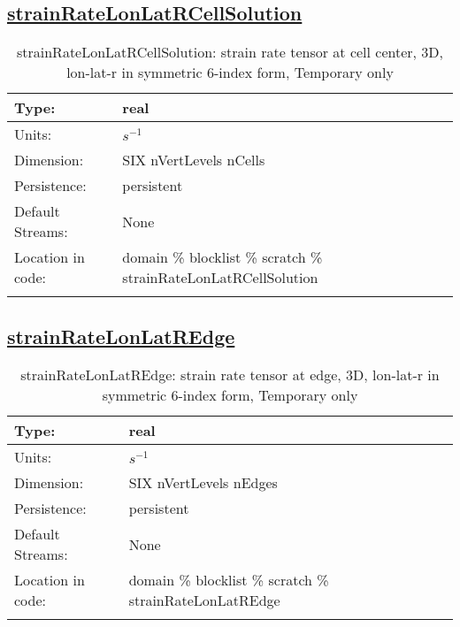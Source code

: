 \subsection[strainRateLonLatRCellSolution]{\hyperref[sec:var_tab_scratch]{strainRateLonLatRCellSolution}}
\label{subsec:var_sec_scratch_strainRateLonLatRCellSolution}
\begin{center}
\begin{longtable}{| p{2.0in} | p{4.0in} |}
        \hline 
        Type: & real \\
        \hline 
        Units: & $s^{-1}$ \\
        \hline 
        Dimension: & SIX nVertLevels nCells \\
        \hline 
        Persistence: & persistent \\
        \hline 
		 Default Streams: & None \\
        \hline 
		 Location in code: & domain \% blocklist \% scratch \% strainRateLonLatRCellSolution \\
		 \hline 
    \caption{strainRateLonLatRCellSolution: strain rate tensor at cell center, 3D, lon-lat-r in symmetric 6-index form, {\color{red}Temporary only}}
\end{longtable}
\end{center}
\subsection[strainRateLonLatREdge]{\hyperref[sec:var_tab_scratch]{strainRateLonLatREdge}}
\label{subsec:var_sec_scratch_strainRateLonLatREdge}
\begin{center}
\begin{longtable}{| p{2.0in} | p{4.0in} |}
        \hline 
        Type: & real \\
        \hline 
        Units: & $s^{-1}$ \\
        \hline 
        Dimension: & SIX nVertLevels nEdges \\
        \hline 
        Persistence: & persistent \\
        \hline 
		 Default Streams: & None \\
        \hline 
		 Location in code: & domain \% blocklist \% scratch \% strainRateLonLatREdge \\
		 \hline 
    \caption{strainRateLonLatREdge: strain rate tensor at edge, 3D, lon-lat-r in symmetric 6-index form, {\color{red}Temporary only}}
\end{longtable}
\end{center}
